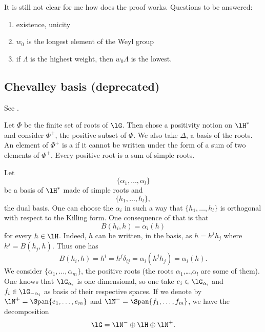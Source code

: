 \begin{probleme}
    It is still not clear for me how does the proof works. Questions to be answered:
    \begin{enumerate}
        \item
            existence, unicity
        \item
            \( w_0\) is the longest element of the Weyl group
        \item
            if \( \Lambda\) is the highest weight, then \( w_0\Lambda\) is the lowest.
    \end{enumerate}
\end{probleme}

                    \subsection{Chevalley basis (deprecated)}
See \cite{SSLA_Modave2005}.

Let $\Phi$ be the finite set of roots of $\lG$. Then chose a positivity notion on $\lH^*$ and consider $\Phi^+$, the positive subset of $\Phi$. We also take $\Delta$, a basis of the roots. An element of $\Phi^+$ is a  if it cannot be written under the form of a sum of two elements of $\Phi^+$. Every positive root is a sum of simple roots. 

Let
\begin{equation}
    \{ \alpha_1,\ldots,\alpha_l \}
\end{equation}
be a basis of $\lH^*$ made of simple roots and
\begin{equation}
    \{ h_1,\ldots,h_l \},
\end{equation}
the dual basis. One can choose the $\alpha_i$ in such a way that $\{ h_1,\ldots,h_l \}$ is orthogonal with respect to the Killing form. One consequence of that is that
\begin{equation}            \label{EqBhihalphaih}
    B(h_i,h)=\alpha_i(h)
\end{equation}
for every $h\in\lH$. Indeed, $h$ can be written, in the basis, as $h=h^jh_j$ where $h^j=B(h_j,h)$. Thus one has
\begin{equation}
    B(h_i,h)=h^i=h^j\delta_{ij}=\alpha_i(h^jh_j)=\alpha_i(h).
\end{equation}
We consider $\{ \alpha_1,\ldots,\alpha_m \}$, the positive roots (the roots $\alpha_1$,\ldots,$\alpha_l$ are some of them). One knows that $\lG_{\alpha_i}$ is one dimensional, so one take $e_i\in\lG_{\alpha_i}$ and $f_i\in\lG_{-\alpha_i}$ as basis of their respective spaces. If we denote by $\lN^+=\Span\{ e_1,\ldots, e_m \}$ and $\lN^-=\Span\{ f_1,\ldots,f_m \}$, we have the decomposition
\begin{equation}
    \lG=\lN^-\oplus\lH\oplus\lN^+.
\end{equation}



